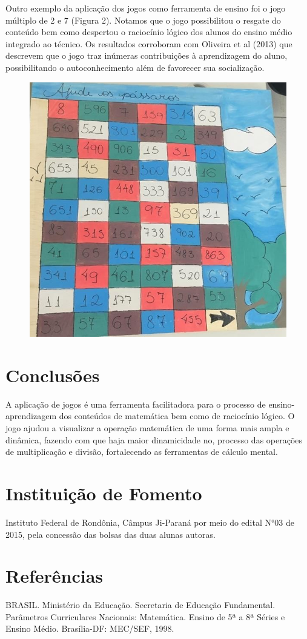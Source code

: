 \documentclass[article,12pt,onesidea,4paper,english,brazil]{abntex2}
\begin{document}
Outro exemplo da aplicação dos jogos como ferramenta de ensino foi o jogo múltiplo de 2 e 7 (Figura 2). Notamos que o jogo possibilitou o resgate do conteúdo bem como despertou o raciocínio lógico dos alunos do ensino médio integrado ao técnico. Os resultados corroboram com Oliveira et al (2013) que descrevem que o jogo traz inúmeras contribuições à aprendizagem do aluno, possibilitando o autoconhecimento além de favorecer sua socialização.

\begin{figure}[h]
	\centering
	\includegraphics[width=0.35\linewidth]{pip09-2.png}
\end{figure}
	
	\section*{Conclusões}
	
A aplicação de jogos é uma ferramenta facilitadora para o processo de ensino-aprendizagem dos conteúdos de matemática bem como de raciocínio lógico.
O jogo ajudou a visualizar a operação matemática de uma forma mais ampla e dinâmica, fazendo com que haja maior dinamicidade no, processo das operações de multiplicação e divisão, fortalecendo as ferramentas de cálculo mental.
	
	\section*{Instituição de Fomento}
	
	Instituto Federal de Rondônia, Câmpus Ji-Paraná por meio do edital N°03 de 2015, pela concessão das bolsas das duas alunas autoras.
	

	\section*{Referências}
	\sloppy
\noindent BRASIL. Ministério da Educação. Secretaria de Educação Fundamental. Parâmetros Curriculares Nacionais: Matemática. Ensino de 5ª a 8ª Séries e Ensino Médio. Brasília-DF: MEC/SEF, 1998.
\end{document}
